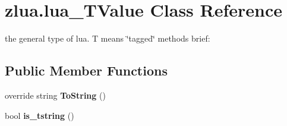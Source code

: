 \hypertarget{classzlua_1_1lua___t_value}{}\section{zlua.\+lua\+\_\+\+T\+Value Class Reference}
\label{classzlua_1_1lua___t_value}


the general type of lua. T means \char`\"{}tagged\char`\"{} methods brief\+:  


\subsection*{Public Member Functions}
\begin{DoxyCompactItemize}
\item 
\mbox{\label{classzlua_1_1lua___t_value_a20dbc4df0c9bccde32812725fab7a2b3}} 
override string {\bfseries To\+String} ()
\item 
\mbox{\label{classzlua_1_1lua___t_value_a0405a3303a63c8dc69fd27fc7739b23f}} 
bool {\bfseries is\+\_\+tstring} ()
\end{DoxyCompactItemize}
